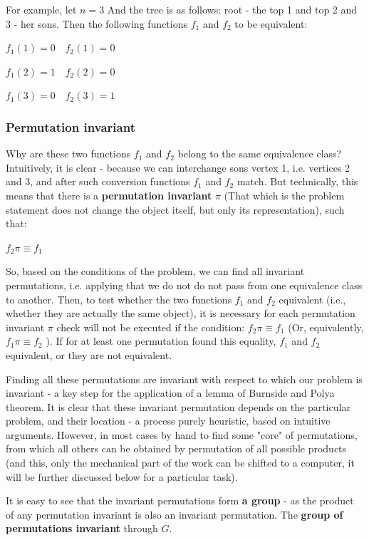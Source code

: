 For example, let $n = 3$ And the tree is as follows: root - the top 1 and top 2 and 3 - her sons. Then the following functions $f_1$ and $f_2$ to be equivalent:

$f_{1}(1)=0\quad f_{2}(1)=0$

$f_{1}(2)=1\quad f_{2}(2)=0$

$f_{1}(3)=0\quad f_{2}(3)=1$

\subsubsection{ Permutation invariant }

Why are these two functions $f_1$ and $f_2$ belong to the same equivalence class? Intuitively, it is clear - because we can interchange sons vertex 1, i.e. vertices 2 and 3, and after such conversion functions $f_1$ and $f_2$ match. But technically, this means that there is a \textbf{permutation invariant} $\pi$ (That which is the problem statement does not change the object itself, but only its representation), such that:

$f_2 \pi \equiv f_1$

So, based on the conditions of the problem, we can find all invariant permutations, i.e. applying that we do not do not pass from one equivalence class to another. Then, to test whether the two functions $f_1$ and $f_2$ equivalent (i.e., whether they are actually the same object), it is necessary for each permutation invariant $\pi$ check will not be executed if the condition: $f_2 \pi \equiv f_1$ (Or, equivalently, $f_1 \pi \equiv f_2$ ). If for at least one permutation found this equality, $f_1$ and $f_2$ equivalent, or they are not equivalent.

Finding all these permutations are invariant with respect to which our problem is invariant - a key step for the application of a lemma of Burnside and Polya theorem. It is clear that these invariant permutation depends on the particular problem, and their location - a process purely heuristic, based on intuitive arguments. However, in most cases by hand to find some "core" of permutations, from which all others can be obtained by permutation of all possible products (and this, only the mechanical part of the work can be shifted to a computer, it will be further discussed below for a particular task).

It is easy to see that the invariant permutations form \textbf{a group} - as the product of any permutation invariant is also an invariant permutation. The \textbf{group of permutations invariant} through $G$.

